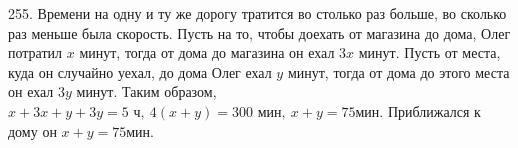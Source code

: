 255. Времени на одну и ту же дорогу тратится во столько раз больше, во сколько раз меньше была скорость. Пусть на то, чтобы доехать от магазина до дома, Олег потратил $x$ минут, тогда от дома до магазина он ехал $3x$ минут. Пусть от места, куда он случайно уехал, до дома Олег ехал $y$ минут, тогда от дома до этого места он ехал $3y$ минут. Таким образом, $x+3x+y+3y=5\text{ ч},\ 4(x+y)=300\text{ мин},\ x+y=75$мин. Приближался к дому он $x+y=75$мин.\\
